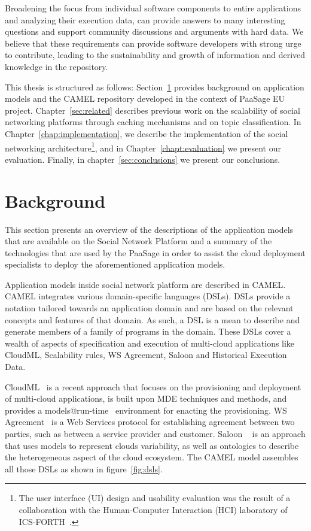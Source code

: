 Broadening the focus from individual software components to entire applications and analyzing their execution data, can provide answers to many interesting questions and support community discussions and arguments with hard data. 
We believe that these requirements can provide software developers with strong urge to contribute, leading to the sustainability and growth of information and derived knowledge in the repository.

This thesis is structured as follows: Section~\ref{sec:background} provides background on application models and the CAMEL repository developed in the context of PaaSage EU project. Chapter~\ref{sec:related} describes previous work on the scalability of social networking platforms through caching mechanisms and on topic classification. In Chapter~\ref{chap:implementation}, we describe the implementation of the social networking architecture\footnote{The user interface (UI) design and usability evaluation was the result of a collaboration with the Human-Computer Interaction (HCI) laboratory of ICS-FORTH~\cite{magoutis2015design}.}, and in Chapter~\ref{chapt:evaluation} we present our evaluation. Finally, in chapter~\ref{sec:conclusions} we present our conclusions.

\section{Background}
\label{sec:background}
This section presents an overview of the descriptions of the application models that are available on the Social Network Platform and a summary of the technologies that are used by the PaaSage in order to assist the cloud deployment specialists to deploy the aforementioned application models.

Application models inside social network platform are described in CAMEL. CAMEL integrates various domain-specific languages (DSLs).
DSLs provide a notation tailored towards an application domain and are based on the relevant concepts and features of that domain. As such, a DSL is a mean to describe and generate members of a family of programs in the domain. 
These DSLs cover a wealth of aspects of specification and execution of multi-cloud applications like CloudML, Scalability rules, WS Agreement, Saloon and Historical Execution Data. 

CloudML~\cite{FerryRossiniCMS13} is a recent approach that focuses on the provisioning and deployment of multi-cloud applications, is built upon MDE techniques and methods, and provides a models@run-time~\cite{models-runtime} environment for enacting the provisioning.  WS Agreement~\cite{andrieux2007web} is a Web Services protocol for establishing agreement between two parties, such as between a service provider and customer. Saloon ~\cite{quinton2013towards} is an approach that uses models to represent clouds variability, as well as ontologies to describe the heterogeneous aspect of the cloud ecosystem. The CAMEL model assembles all those DSLs as shown in figure~\ref{fig:dsls}.

